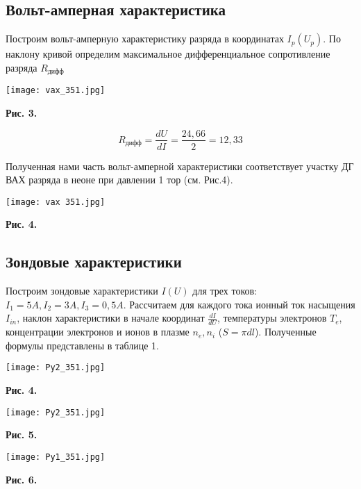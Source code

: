 \documentclass [a4paper, 12pt]{article}
\begin{document}
\subsection{Вольт-амперная характеристика}

    Построим вольт-амперную характеристику разряда в координатах $I_p(U_p)$. По наклону кривой определим максимальное дифференциальное сопротивление разряда $R_{дифф}$

\begin{center}
\texttt{[image: vax\_351.jpg]}
\end{center}
\begin{flushright}
{\small \textbf{Рис. 3.} }
\end{flushright}

\[R_{дифф} = \frac{dU}{dI} = \frac{24,66}{2} = 12,33\]

    Полученная нами часть вольт-амперной характеристики соответствует участку ДГ ВАХ разряда в неоне при давлении  1 тор (см. Рис.4).

\begin{center}
\texttt{[image: vax 351.jpg]}
\end{center}
\begin{flushright}
{\small \textbf{Рис. 4.} }
\end{flushright}   


\subsection{Зондовые характеристики}

    Построим зондовые характеристики $I(U)$ для трех токов: $I_1 = 5 A, I_2 = 3 A, I_3 = 0,5 A$. Рассчитаем для каждого тока ионный ток насыщения $I_{in}$, наклон характеристики в начале координат $\frac{dI}{dU}$, температуры электронов $T_e$, концентрации электронов и ионов в плазме $n_e, n_i$ ($S = \pi d l$). Полученные формулы представлены в таблице 1.


    
\begin{center}
\texttt{[image: Py2\_351.jpg]}
\end{center}
\begin{flushright}
{\small \textbf{Рис. 4.} }
\end{flushright}
\begin{center}
\texttt{[image: Py2\_351.jpg]}
\end{center}
\begin{flushright}
{\small \textbf{Рис. 5.} }
\end{flushright}
\begin{center}
\texttt{[image: Py1\_351.jpg]}
\end{center}
\begin{flushright}
{\small \textbf{Рис. 6.} }
\end{flushright}
\end{document}
